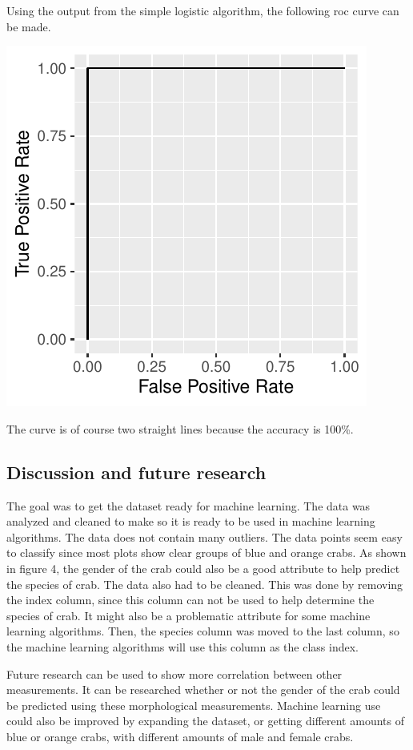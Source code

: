 \documentclass[
]{article}
\begin{document}
Using the output from the simple logistic algorithm, the following roc
curve can be made.

\begin{center}\includegraphics{Log_files/figure-latex/roc-1} \end{center}

The curve is of course two straight lines because the accuracy is 100\%.

\newpage

\hypertarget{discussion-and-future-research}{%
\subsection{Discussion and future
research}\label{discussion-and-future-research}}

The goal was to get the dataset ready for machine learning. The data was
analyzed and cleaned to make so it is ready to be used in machine
learning algorithms. The data does not contain many outliers. The data
points seem easy to classify since most plots show clear groups of blue
and orange crabs. As shown in figure 4, the gender of the crab could
also be a good attribute to help predict the species of crab. The data
also had to be cleaned. This was done by removing the index column,
since this column can not be used to help determine the species of crab.
It might also be a problematic attribute for some machine learning
algorithms. Then, the species column was moved to the last column, so
the machine learning algorithms will use this column as the class index.

Future research can be used to show more correlation between other
measurements. It can be researched whether or not the gender of the crab
could be predicted using these morphological measurements. Machine
learning use could also be improved by expanding the dataset, or getting
different amounts of blue or orange crabs, with different amounts of
male and female crabs.

\newpage
\end{document}

